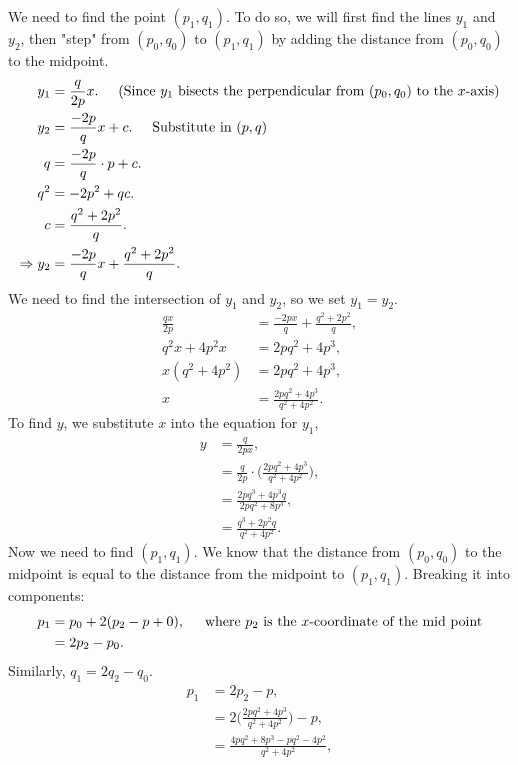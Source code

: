 \documentclass{amsart}
\theoremstyle{definition}
\theoremstyle{remark}
\begin{document}
\begin{enumerate}
\begin{enumerate}
We need to find the point $(p_1,q_1)$. To do so, we will first find the lines $y_1$ and $y_2$, then "step" from $(p_0,q_0)$ to $(p_1,q_1)$ by adding the distance from $(p_0,q_0)$ to the midpoint.
\begin{align*}
y_1 &= \frac{q}{2p}x. \hspace{0.5cm} \text{(Since } y_1 \text{ bisects the perpendicular from } (p_0,q_0) \text{ to the } x \text{-axis)}\\
y_2 &= \frac{-2p}{q}x + c. \hspace{0.5cm} \text{Substitute in } (p,q)\\
q &= \frac{-2p}{q} \cdot p + c.\\
q^2 &= -2p^2 + qc.\\
c &= \frac{q^2+2p^2}{q}.\\
\Rightarrow y_2 &= \frac{-2p}{q}x + \frac{q^2 + 2p^2}{q}.
\end{align*}
We need to find the intersection of $y_1$ and $y_2$, so we set $y_1 = y_2$.
\begin{align*}
\frac{qx}{2p} &= \frac{-2px}{q} + \frac{q^2+2p^2}{q},\\
q^2x+4p^2x &= 2pq^2 +4p^3,\\
x(q^2+4p^2) &= 2pq^2+4p^3,\\
x &= \frac{2pq^2 +4p^3}{q^2+4p^2}.
\end{align*}
To find $y$, we substitute $x$ into the equation for $y_1$,
\begin{align*}
y &= \frac{q}{2px},\\
&= \frac{q}{2p} \cdot \bigg( \frac{2pq^2 + 4p^3}{q^2+4p^2} \bigg),\\
&= \frac{2pq^3+4p^3q}{2pq^2+8p^3},\\
&= \frac{q^3+2p^2q}{q^2+4p^2}.
\end{align*}
Now we need to find $(p_1,q_1)$. We know that the distance from $(p_0,q_0)$ to the midpoint is equal to the distance from the midpoint to $(p_1,q_1)$. Breaking it into components:
\begin{align*}
p_1 &= p_0 + 2(p_2-p+0), \hspace{0.5cm} \text{where } p_2 \text{ is the } x \text{-coordinate of the mid point}\\
&= 2p_2 - p_0.
\end{align*}
Similarly, $q_1 = 2q_2 - q_0$.
\begin{align*}
p_1 &= 2p_2-p,\\
&= 2 \bigg( \frac{2pq^2 + 4p^3}{q^2+4p^2} \bigg) - p,\\
&= \frac{4pq^2 + 8p^3 - pq^2 - 4p^2}{q^2+4p^2},\\

\end{align*}
\end{enumerate}
\end{enumerate}
\end{document}
